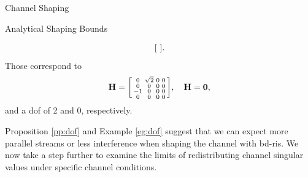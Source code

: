 \documentclass[journal]{IEEEtran}
\begin{document}
\begin{section}{Channel Shaping}
\begin{subsection}{Analytical Shaping Bounds}
\begin{example}
\begin{equation*}
\begin{bsmallmatrix}
				\end{bsmallmatrix}.
			\end{equation*}
			Those correspond to
			\begin{equation*}
				\mathbf{H} =
				\begin{bsmallmatrix}
					0 & \sqrt{2} & 0 & 0 \\
					0 & 0 & 0 & 0 \\
					-1 & 0 & 0 & 0 \\
					0 & 0 & 0 & 0
				\end{bsmallmatrix}, \quad
				\mathbf{H} = \mathbf{0},
			\end{equation*}
			and a \gls{dof} of 2 and 0, respectively.
		\end{example}

		Proposition \ref{pp:dof} and Example \ref{eg:dof} suggest that we can expect more parallel streams or less interference when shaping the channel with \gls{bd}-\gls{ris}.
		We now take a step further to examine the limits of redistributing channel singular values under specific channel conditions.


\end{subsection}
\end{section}
\end{document}
